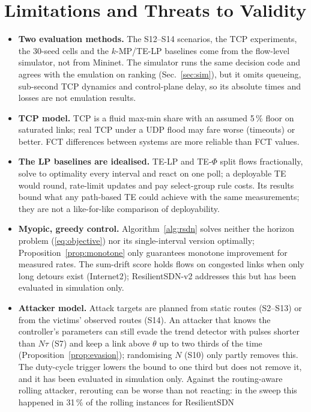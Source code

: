 \section{Limitations and Threats to Validity}\label{sec:limits}
\begin{itemize}
\item \textbf{Two evaluation methods.} The S12--S14 scenarios, the TCP experiments, the 30-seed
  cells and the $k$-MP/TE-LP baselines come from the flow-level simulator, not from Mininet. The
  simulator runs the same decision code and agrees with the emulation on ranking
  (Sec.~\ref{sec:sim}), but it omits queueing, sub-second TCP dynamics and control-plane delay, so
  its absolute times and losses are not emulation results.
\item \textbf{TCP model.} TCP is a fluid max-min share with an assumed 5\,\% floor on saturated
  links; real TCP under a UDP flood may fare worse (timeouts) or better. FCT differences between
  systems are more reliable than FCT values.
\item \textbf{The LP baselines are idealised.} TE-LP and TE-$\Phi$ split flows fractionally, solve to optimality every
  interval and react on one poll; a deployable TE would round, rate-limit updates and pay
  select-group rule costs. Its results bound what any path-based TE could achieve with the same
  measurements; they are not a like-for-like comparison of deployability.
\item \textbf{Myopic, greedy control.} Algorithm~\ref{alg:rsdn} solves neither the horizon problem
  (\ref{eq:objective}) nor its single-interval version optimally; Proposition~\ref{prop:monotone}
  only guarantees monotone improvement for measured rates. The sum-drift score holds flows on
  congested links when only long detours exist (Internet2); ResilientSDN-v2 addresses this but has
  been evaluated in simulation only.
\item \textbf{Attacker model.} Attack targets are planned from static routes (S2--S13) or from the
  victims' observed routes (S14). An attacker that knows the controller's parameters can still
  evade the trend detector with pulses shorter than $N\tau$ (S7) and keep a link above $\theta$ up to
  two thirds of the time (Proposition~\ref{prop:evasion}); randomising $N$ (S10) only partly removes
  this. The duty-cycle trigger lowers the bound to one third but does not remove it, and it has been
  evaluated in simulation only. Against the routing-aware rolling attacker, rerouting can be worse
  than not reacting: in the sweep this happened in 31\,\% of the rolling instances for ResilientSDN

\end{itemize}
